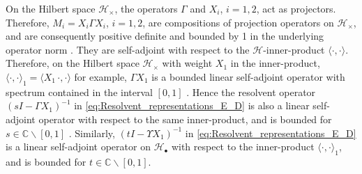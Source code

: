 \documentclass[11pt]{amsart}
\begin{document}
On the Hilbert space $\mathscr{H}_\times$, the operators $\Gamma$ and $X_i$,
$i=1,2$, act as projectors. Therefore, $M_i=X_i\Gamma X_i$, $i=1,2$, are
compositions of projection operators on 
$\mathscr{H}_\times$, and are consequently positive definite and bounded by
1 in the underlying operator norm \cite{Rudin:87}. They are
self-adjoint with respect to the $\mathscr{H}$-inner-product
$\langle\cdot,\cdot\rangle$. Therefore, on the Hilbert space $\mathscr{H}_\times$ 
with weight $X_1$ in the inner-product, $\langle\cdot,\cdot\rangle_1=\langle X_1\,\cdot,\cdot\rangle$ for
example, $\Gamma X_1$ is a bounded linear self-adjoint operator with
spectrum contained in the interval $[0,1]$
\cite{Golden:CMP-473,Folland:95,Rudin:87}. Hence the resolvent
operator $(sI-\Gamma X_1)^{-1}$ in \eqref{eq:Resolvent_representations_E_D}
is also a linear self-adjoint operator with respect to the same
inner-product, and is bounded for  $s\in\mathbb{C}\backslash[0,1]$
\cite{Stone:64}. Similarly, $(tI-\Upsilon X_1)^{-1}$ in
\eqref{eq:Resolvent_representations_E_D} is a linear self-adjoint
operator on $\mathscr{H}_\bullet$ with respect to the inner-product
$\langle\cdot,\cdot\rangle_1$, and is bounded for $t\in\mathbb{C}\backslash[0,1]$.
\end{document}
